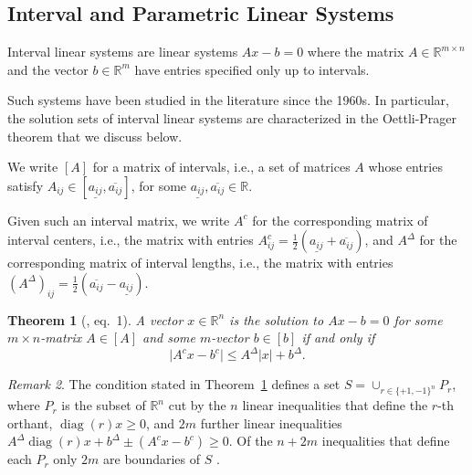 \documentclass{article}
\newtheorem{theorem}{Theorem}[section]
\theoremstyle{definition}
\theoremstyle{remark}
\newtheorem{remark}[theorem]{Remark}
\begin{document}
\subsection{Interval and Parametric Linear Systems}\label{sec:intervals}

Interval linear systems are linear systems $A x - b = 0$ where the matrix $A\in\mathbb{R}^{m\times n}$ and the vector $b\in\mathbb{R}^m$ have entries specified only up to intervals. 

Such systems have been studied in the literature since the 1960s. In particular, the solution sets of interval linear systems are characterized in the Oettli-Prager theorem that we discuss below. 

We write $[A]$ for a matrix of intervals, i.e., a set of matrices $A$ whose entries satisfy $A_{ij} \in [\underline{a_{ij}}, \overline{a_{ij}}]$, for some $\underline{a_{ij}}, \overline{a_{ij}}\in\mathbb{R}$. 

Given such an interval matrix, we write $A^c$ for the corresponding matrix of interval centers, i.e., the matrix with entries $A^c_{ij}=\frac12(\underline{a_{ij}} + \overline{a_{ij}})$, and $A^\Delta$ for the corresponding matrix of interval lengths, i.e., the matrix with entries $(A^\Delta)_{ij}= \frac12(\overline{a_{ij}}-\underline{a_{ij}})$. 

\begin{theorem}[{\citealp[as stated by \citealp{rohnSystemsLinearInterval1989}]{Oettli-Prager-1964}}, eq.~1] 
\label{th:Oettli-Prager}
A vector $x\in\mathbb{R}^n$ is the solution to $Ax-b=0$ for some $m\times n$-matrix $A\in[A]$ and some $m$-vector $b\in [b]$ if and only if 
\begin{equation*}
    \vert A^c x - b^c\vert   \leq   A^\Delta \vert x\vert  + b^\Delta . 
\end{equation*}
\end{theorem}

\begin{remark}
The condition stated in Theorem~\ref{th:Oettli-Prager} defines a set $S = \cup_{r\in\{+1,-1\}^n} P_r$, where $P_r$ is the subset of $\mathbb{R}^n$ cut by the $n$ linear inequalities that define the $r$-th orthant, $\operatorname{diag}(r) x\geq 0$, and $2m$ further linear inequalities $A^\Delta \operatorname{diag}(r)x + b^\Delta \pm (A^c x - b^c) \geq 0$. Of the $n+2m$ inequalities that define each $P_r$ only $2m$ are boundaries of $S$ \citep[see, e.g.,][Theorem 1, f]{alefeld-2001-modifications}. 
\end{remark}
 
\end{document}
